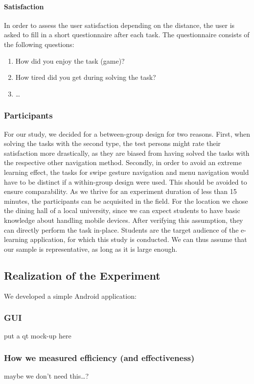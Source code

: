 \documentclass{sig-alternate-05-2015}
\begin{document}
\paragraph{Satisfaction}
In order to assess the user satisfaction depending on the distance, the user is asked to fill in a short questionnaire after each task.
The questionnaire consists of the following questions:
\begin{enumerate}
  \item How did you enjoy the task (game)?
  \item How tired did you get during solving the task?
  \item \ldots
\end{enumerate}
\subsubsection{Participants}
For our study, we decided for a between-group design for two reasons. First, when solving the tasks with the second type, the test persons might rate their satisfaction more drastically, as they
are biased from having solved the tasks with the respective other navigation method. Secondly, in order to avoid an extreme learning effect, the tasks for swipe gesture navigation and menu navigation
would have to be distinct if a within-group design were used. This should be avoided to ensure comparability.
As we thrive for an experiment duration of less than 15 minutes,
the participants can be acquisited in the field.
For the location we chose the dining hall of a local university,
since we can expect students to have basic knowledge about handling mobile devices.
After verifying this assumption, they can directly perform the task in-place.
Students are the target audience of the e-learning application,
for which this study is conducted.
We can thus assume that our sample is representative, as long as it is large enough.
\subsection{Realization of the Experiment}
We developed a simple Android application:
\subsubsection{GUI}
put a qt mock-up here
\subsubsection{How we measured efficiency (and effectiveness)}
maybe we don't need this\ldots?
\end{document}

